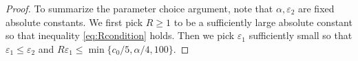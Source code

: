\documentclass[11pt]{article}
\theoremstyle{definition}
\numberwithin{theorem}{section}
\numberwithin{equation}{section}
\renewcommand{\tilde}{\widetilde}
\renewcommand{\epsilon}{\varepsilon}
\newcommand{\commentout}[1]{}
\def\forallspace{\quad\text{for all}\quad}
\newcommand{\noteW}[1]{\textcolor{purple}{{\textbf{Weilin:} #1}}}
\numberwithin{equation}{section}
\begin{document}
\begin{proof}
    To summarize the parameter choice argument, note that $\alpha,\epsilon_2$ are fixed absolute constants. We first pick $R\geq 1$ to be a sufficiently large absolute constant so that inequality \eqref{eq:Rcondition} holds. Then we pick $\epsilon_1$ sufficiently small so that $\epsilon_1\leq \epsilon_2$ and  $R\epsilon_1\leq \min\{c_0/5, \alpha/4, 100\}$.  
\end{proof}



\end{document}
